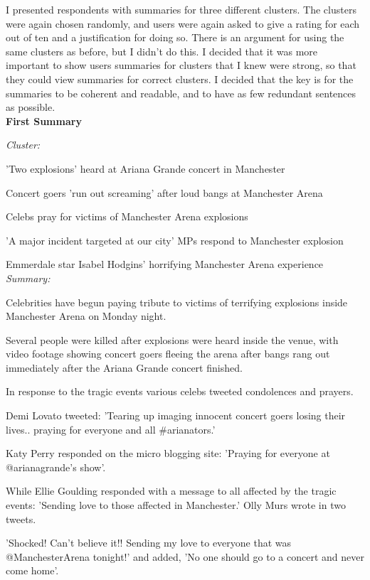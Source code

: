 \documentclass[12pt]{article}
\begin{document}
I presented respondents with summaries for three different clusters. The clusters were again chosen randomly, and users were again asked to give a rating for each out of ten and a justification for doing so. There is an argument for using the same clusters as before, but I didn't do this. I decided that it was more important to show users summaries for clusters that I knew were strong, so that they could view summaries for correct clusters. I decided that the key is for the summaries to be coherent and readable, and to have as few redundant sentences as possible. \\

\textbf{First Summary}

\begin{mdframed}

\emph{Cluster:}

'Two explosions' heard at Ariana Grande concert in Manchester

Concert goers 'run out screaming' after loud bangs at Manchester Arena

Celebs pray for victims of Manchester Arena explosions

'A major incident targeted at our city' MPs respond to Manchester explosion

Emmerdale star Isabel Hodgins' horrifying Manchester Arena experience \\

\emph{Summary:}

Celebrities have begun paying tribute to victims of terrifying explosions inside Manchester Arena on Monday night.

Several people were killed after explosions were heard inside the venue, with video footage showing concert goers fleeing the arena after bangs rang out immediately after the Ariana Grande concert finished.

In response to the tragic events various celebs tweeted condolences and prayers.

Demi Lovato tweeted: 'Tearing up imaging innocent concert goers losing their lives.. praying for everyone and all \#arianators.'

Katy Perry responded on the micro blogging site: 'Praying for everyone at @arianagrande's show'.

While Ellie Goulding responded with a message to all affected by the tragic events: 'Sending love to those affected in Manchester.' Olly Murs wrote in two tweets.

'Shocked! Can't believe it!! Sending my love to everyone that was @ManchesterArena tonight!' and added, 'No one should go to a concert and never come home'.


\end{mdframed}
\end{document}
